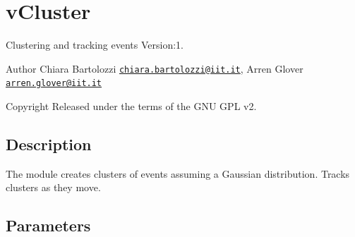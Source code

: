 \hypertarget{group__vCluster}{}\section{v\+Cluster}
\label{group__vCluster}
Clustering and tracking events Version\+:1. \begin{DoxyAuthor}{Author}
Chiara Bartolozzi \href{mailto:chiara.bartolozzi@iit.it}{\tt chiara.\+bartolozzi@iit.\+it}, Arren Glover \href{mailto:arren.glover@iit.it}{\tt arren.\+glover@iit.\+it} ~\newline
 
\end{DoxyAuthor}
\begin{DoxyCopyright}{Copyright}
Released under the terms of the G\+NU G\+PL v2. 
\end{DoxyCopyright}
\hypertarget{group__zynqGrabber_intro_sec}{}\subsection{Description}\label{group__zynqGrabber_intro_sec}
The module creates clusters of events assuming a Gaussian distribution. Tracks clusters as they move.\hypertarget{group__zynqGrabber_parameters_sec}{}\subsection{Parameters}\label{group__zynqGrabber_parameters_sec}

